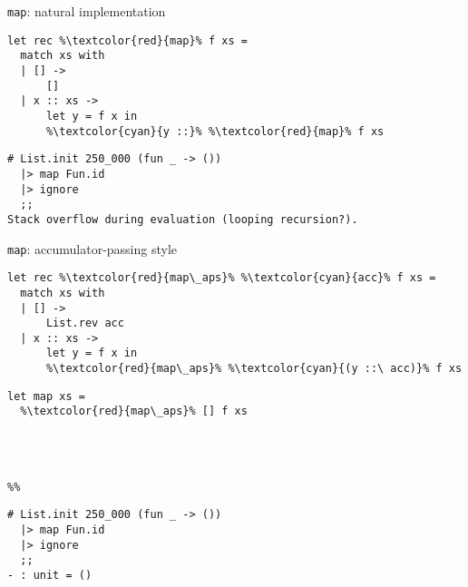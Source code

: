 \begin{frame}[fragile]{\texttt{map}: natural implementation}
\begin{lstlisting}
let rec %\textcolor{red}{map}% f xs =
  match xs with
  | [] ->
      []
  | x :: xs ->
      let y = f x in
      %\textcolor{cyan}{y ::}% %\textcolor{red}{map}% f xs
\end{lstlisting}
\vfill
\begin{lstlisting}
# List.init 250_000 (fun _ -> ())
  |> map Fun.id
  |> ignore
  ;;
Stack overflow during evaluation (looping recursion?).
\end{lstlisting}
\end{frame}

\begin{frame}[fragile]{\texttt{map}: accumulator-passing style}
\begin{minipage}{0.5\linewidth}
\begin{lstlisting}
let rec %\textcolor{red}{map\_aps}% %\textcolor{cyan}{acc}% f xs =
  match xs with
  | [] ->
      List.rev acc
  | x :: xs ->
      let y = f x in
      %\textcolor{red}{map\_aps}% %\textcolor{cyan}{(y ::\ acc)}% f xs
\end{lstlisting}
\end{minipage}
\begin{minipage}{0.45\linewidth}
\begin{lstlisting}
let map xs =
  %\textcolor{red}{map\_aps}% [] f xs




%%
\end{lstlisting}
\end{minipage}
\vfill
\begin{lstlisting}
# List.init 250_000 (fun _ -> ())
  |> map Fun.id
  |> ignore
  ;;
- : unit = ()
\end{lstlisting}
\end{frame}

